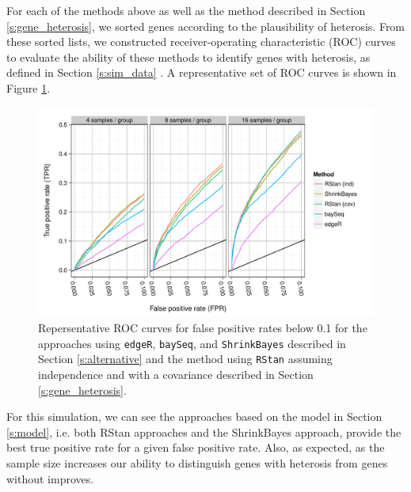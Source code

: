 \documentclass[useAMS,usenatbib,referee]{biom}
\begin{document}
For each of the methods above as well as the method described in Section \ref{s:gene_heterosis}, we sorted genes according to the plausibility of heterosis. From these sorted lists, we constructed receiver-operating characteristic (ROC) curves to evaluate the ability of these methods to identify genes with heterosis, as defined in Section \ref{s:sim_data}  \citep{landau2013dispersion}. A representative set of ROC curves is shown in Figure \ref{f:roc}. 
\begin{figure}[htbp]
\centerline{\includegraphics[width=\textwidth]{exampleROC0_1}}
\caption{Repersentative ROC curves for false positive rates below 0.1 for the approaches using {\tt edgeR}, {\tt baySeq},  and {\tt ShrinkBayes} described in Section \ref{s:alternative} and the method using {\tt RStan} assuming independence and with a covariance described in Section \ref{s:gene_heterosis}.}
\label{f:roc}
\end{figure}
For this simulation, we can see the approaches based on the model in Section \ref{s:model}, i.e. both RStan approaches and the ShrinkBayes approach, provide the best true positive rate for a given false positive rate. Also, as expected, as the sample size increases our ability to distinguish genes with heterosis from genes without improves.
\end{document}
